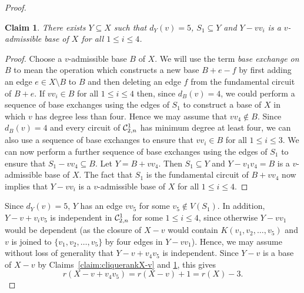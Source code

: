 \documentclass{daj}
\newtheorem{claim}[thm]{Claim}\theoremstyle{plain}
\newcommand{\sm}{{\setminus}}
\begin{document}
\begin{proof}
\begin{claim}\label{claim:clique_S1} There exists $Y\subseteq X$ such that $d_Y(v)=5$, $S_1\subseteq Y$ and $Y-vv_i$ is a $v$-admissible base of $X$ for all $1\leq i\leq 4$.
\end{claim}
\begin{proof}
Choose a $v$-admissible base $B$ of $X$. We will use the term {\em base exchange on $B$} to mean the operation which constructs a new base $B+e-f$ by first adding an edge $e\in X\sm B$ to $B$ and then deleting an edge $f$ from the fundamental circuit of $B+e$.
If $vv_i\in B$ for all $1\leq i\leq 4$ then, since $d_B(v)=4$, we could perform a sequence of base exchanges using the edges of $S_1$ to construct a base of $X$ in which $v$ has degree less than four.
 Hence we may assume that $vv_4\not\in B$.
Since $d_B(v)=4$ and every circuit of ${\cal C}_{2,n}^1$ has minimum degree at least four, we can also use a sequence of base exchanges to ensure that $vv_i\in B$ for all $1\leq i\leq 3$. We can now perform a further sequence of base exchanges using the edges of $S_1$ to ensure that $S_1-vv_4\subseteq B$. Let $Y=B+vv_4$. Then $S_1\subseteq Y$ and $Y-v_1v_4=B$ is a $v$-admissible base of $X$.
The fact that $S_1$ is the fundamental circuit of $B+vv_4$ now implies that $Y-vv_i$ is a $v$-admissible base of $X$ for all $1\leq i\leq 4$.
\end{proof}



%

Since $d_Y(v)=5$, $Y$ has an edge $vv_5$ for some $v_5\notin V(S_1)$.
In addition,   $Y-v+v_iv_5$ is independent in ${\cal C}_{2,n}^1$ for some $1\leq i\leq 4$,  since otherwise $Y-vv_1$ would be dependent
(as the closure of $X-v$ would contain  $K(v_1,v_2,\dots, v_5)$ and $v$ is joined to $\{v_1,v_2,\dots, v_5\}$ by four edges in $Y-vv_1$).
Hence, we may  assume without loss of generality that $Y-v+v_4v_5$ is independent.
Since $Y-v$ is a base of $X-v$ by Claims~\ref{claim:cliquerankX-v} and \ref{claim:clique_S1}, this gives
\begin{equation}\label{eq:cliquerankX-v+v4v5}
r(X-v+v_4v_5)=r(X-v)+1=r(X)-3.
\end{equation}


\end{proof}
\end{document}
